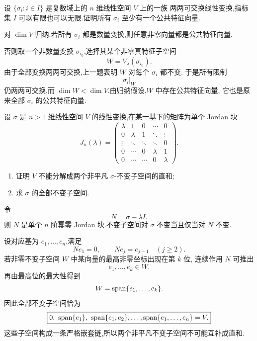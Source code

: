\begin{example}[\markstar]
设 $\{\sigma_i:i\in I\}$ 是复数域上的 $n$ 维线性空间 $V$ 上的一族
两两可交换线性变换,指标集 $I$ 可以有限也可以无限.证明所有 $\sigma_i$
至少有一个公共特征向量.
\end{example}
\exampleblank

\begin{solution}
对 $\dim V$ 归纳.若所有 $\sigma_i$ 都是数量变换,则任意非零向量都是公共特征向量.

否则取一个非数量变换 $\sigma_{i_0}$,选择其某个非零真特征子空间
\[
W=V_\lambda(\sigma_{i_0}).
\]
由于全部变换两两可交换,上一题表明 $W$ 对每个 $\sigma_i$ 都不变.
于是所有限制
\[
\sigma_i|_W
\]
仍两两可交换,而 $\dim W<\dim V$.由归纳假设,$W$ 中存在公共特征向量,
它也是原来全部 $\sigma_i$ 的公共特征向量.
\end{solution}


\begin{example}[\markstar]
设 $\sigma$ 是 $n>1$ 维线性空间 $V$ 的线性变换,在某一基下的矩阵为单个
Jordan 块
\[
J_n(\lambda)=
\begin{pmatrix}
\lambda&1&0&\cdots&0\\
0&\lambda&1&\ddots&\vdots\\
\vdots&\ddots&\ddots&\ddots&0\\
0&\cdots&0&\lambda&1\\
0&\cdots&\cdots&0&\lambda
\end{pmatrix}.
\]
\begin{enumerate}
    \item 证明 $V$ 不能分解成两个非平凡 $\sigma$-不变子空间的直和;
    \item 求 $\sigma$ 的全部不变子空间.
\end{enumerate}
\end{example}
\exampleblank

\begin{solution}
令
\[
N=\sigma-\lambda I.
\]
则 $N$ 是单个 $n$ 阶幂零 Jordan 块.不变子空间对 $\sigma$ 不变当且仅当对
$N$ 不变.

设对应基为 $e_1,\ldots,e_n$,满足
\[
Ne_1=0,\qquad
Ne_j=e_{j-1}\quad(j\geq2).
\]
若非零不变子空间 $W$ 中某向量的最高非零坐标出现在第 $k$ 位,
连续作用 $N$ 可推出
\[
e_1,\ldots,e_k\in W.
\]
再由最高位的最大性得到
\[
W=\operatorname{span}\{e_1,\ldots,e_k\}.
\]
因此全部不变子空间恰为
\[
\boxed{
0,\ 
\Span\{e_1\},\
\Span\{e_1,e_2\},\ldots,
\Span\{e_1,\ldots,e_n\}=V.
}
\]
这些子空间构成一条严格嵌套链,所以两个非平凡不变子空间不可能互补成直和.
\end{solution}


